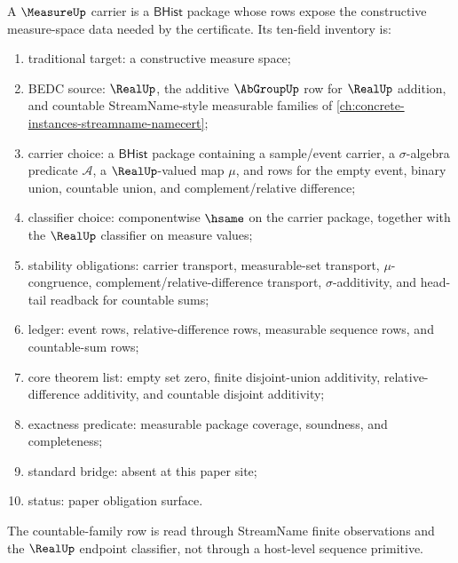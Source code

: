 \begin{definition}
\label{def:measureup-carrier-obligation-inventory}
A $\MeasureUp$ carrier is a $\mathsf{BHist}$ package whose rows expose the
constructive measure-space data needed by the certificate. Its ten-field
inventory is:
\begin{enumerate}
  \item traditional target: a constructive measure space;
  \item BEDC source: $\RealUp$, the additive $\AbGroupUp$ row for $\RealUp$
  addition, and countable StreamName-style measurable families of
  \autoref{ch:concrete-instances-streamname-namecert};
  \item carrier choice: a $\mathsf{BHist}$ package containing a sample/event
  carrier, a $\sigma$-algebra predicate $\mathcal{A}$, a $\RealUp$-valued map
  $\mu$, and rows for the empty event, binary union, countable union, and
  complement/relative difference;
  \item classifier choice: componentwise $\hsame$ on the carrier package,
  together with the $\RealUp$ classifier on measure values;
  \item stability obligations: carrier transport, measurable-set transport,
  $\mu$-congruence, complement/relative-difference transport,
  $\sigma$-additivity, and head-tail readback for countable sums;
  \item ledger: event rows, relative-difference rows, measurable sequence
  rows, and countable-sum rows;
  \item core theorem list: empty set zero, finite disjoint-union additivity,
  relative-difference additivity, and countable disjoint additivity;
  \item exactness predicate: measurable package coverage, soundness, and
  completeness;
  \item standard bridge: absent at this paper site;
  \item status: paper obligation surface.
\end{enumerate}
The countable-family row is read through StreamName finite observations and
the $\RealUp$ endpoint classifier, not through a host-level sequence primitive.
\end{definition}

